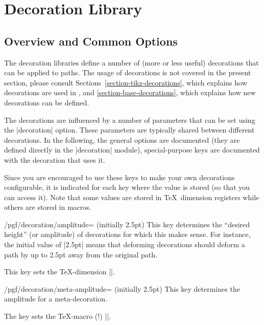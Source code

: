 %
%
%


\section{Decoration Library}
\label{section-library-decorations}


\subsection{Overview and Common Options}

The decoration libraries define a number of (more or less useful) decorations
that can be applied to paths. The usage of decorations is not covered in the
present section, please consult Sections~\ref{section-tikz-decorations}, which
explains how decorations are used in \tikzname, and
\ref{section-base-decorations}, which explains how new decorations can be
defined.

The decorations are influenced by a number of parameters that can be set using
the |decoration| option. These parameters are typically shared between
different decorations. In the following, the general options are documented
(they are defined directly in the |decoration| module), special-purpose keys
are documented with the decoration that uses it.

Since you are encouraged to use these keys to make your own decorations
configurable, it is indicated for each key where the value is stored (so that
you can access it). Note that some values are stored in \TeX\ dimension
registers while others are stored in macros.

\begin{key}{/pgf/decoration/amplitude= (initially 2.5pt)}
    This key determines the ``desired height'' (or amplitude) of decorations
    for which this makes sense. For instance, the initial value of |2.5pt|
    means that deforming decorations should deform a path by up to 2.5pt away
    from the original path.

    This key sets the \TeX-dimension |\pgfdecorationsegmentamplitude|.
\end{key}

\begin{key}{/pgf/decoration/meta-amplitude= (initially 2.5pt)}
    This key determines the amplitude for a meta-decoration.

    The key sets the \TeX-macro (!) |\pgfmetadecorationsegmentamplitude|.
\end{key}

